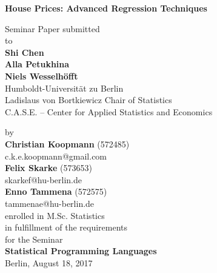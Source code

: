 \begin{center}

    {\Large{\bf House Prices: Advanced Regression Techniques}} \vspace{0.5cm}


    {\normalsize Seminar Paper submitted\\\vspace{0.5cm}
    to}\\\vspace{0.5cm}
    {\normalsize{\bf Shi Chen \\Alla Petukhina \\Niels Wesselh\"offt}} \\\vspace{0.5cm}
    {\normalsize Humboldt-Universit\"at zu Berlin \\
    Ladislaus von Bortkiewicz Chair of Statistics \\
    C.A.S.E. – Center for Applied Statistics
and Economics} \vspace{1cm}


    {\normalsize by \\\vspace{0.5cm}
    {\bf Christian Koopmann}
    (572485)}\\
c.k.e.koopmann@gmail.com\\ 

    {\normalsize
    {\bf Felix Skarke}
    (573653)}\\
skarkef@hu-berlin.de\\
   {\normalsize
   {\bf Enno Tammena}
    (572575)}\\
 tammenae@hu-berlin.de\\
\vspace{1cm}
enrolled in M.Sc. Statistics\\
\vspace{1cm}
    {\normalsize in fulfillment of the requirements  \\
    for the Seminar \\
    {\bf Statistical Programming Languages} \\
    Berlin, August 18, 2017}

\end{center}

